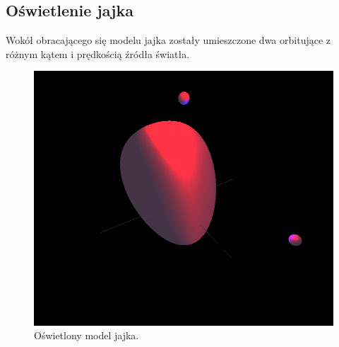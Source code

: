 \subsection{Oświetlenie jajka}
Wokół obracającego się modelu jajka zostały umieszczone dwa orbitujące z różnym kątem i prędkością źródła światła.
\begin{figure}[H]
    \centering
    \includegraphics[width=0.8\linewidth, trim={0cm 6cm 0cm 0.5cm},clip]{img/egg_4.png}
    \caption{Oświetlony model jajka.}
\end{figure}